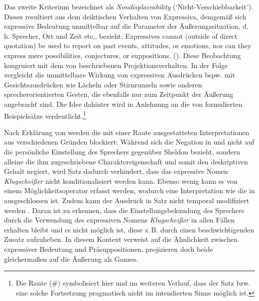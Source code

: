 Das zweite Kriterium bezeichnet \citet[169ff.]{Potts.2007a} als \textit{Nondisplaceability} (`Nicht-Verschiebbarkeit'). Dieses resultiert aus dem deiktischen Verhalten von Expressiva, demgemäß sich expressive Bedeutung unmittelbar auf die Parameter der Äußerungssituation, d.\,h. Sprecher, Ort und Zeit etc., bezieht: \glqq{}Expressives cannot (outside of direct quotation) be used to report on past events, attitudes, or emotions, nor can they express mere possibilities, conjectures, or suppositions.\grqq{} ({\citealt[169]{Potts.2007a}}). Diese Beobachtung kongruiert mit dem von {\citet[8]{Kaplan.1997}} beschriebenen Projektionsverhalten. In der Folge vergleicht {\citet[272]{Cruse.1986}} die unmittelbare Wirkung von expressiven Ausdrücken bspw. mit Gesichtsausdrücken wie Lächeln oder Stirnrunzeln sowie anderen sprecherorientierten Gesten, die ebenfalls nur zum Zeitpunkt der Äußerung angebracht sind. Die Idee dahinter wird in Anlehnung an die von {\citet[10]{dAvis.2019b}} formulierten Beispielsätze verdeutlicht.\footnote{Die Raute (\#) symbolisiert hier und im weiteren Verlauf, dass der Satz bzw. eine solche Fortsetzung pragmatisch nicht im intendierten Sinne möglich ist.}

\ea   \label{sheldon2}
 \z
 \z

Nach Erklärung von {\citet[10]{dAvis.2019b}} werden die mit einer Raute ausgestatteten Interpretationen aus verschiedenen Gründen blockiert: Während sich die Negation in  und  nicht auf die persönliche Einstellung des Sprechers gegenüber Sheldon bezieht, sondern alleine die ihm zugeschriebene Charaktereigenschaft und somit den deskriptiven Gehalt negiert, wird {Satz } dadurch verhindert, dass das expressive Nomen \textit{Klugscheißer} nicht konditionalisiert werden kann. Ebenso wenig kann es von einem Möglichkeitsoperator erfasst werden, wodurch eine Interpretation wie die in  ausgeschlossen ist. Zudem kann der Ausdruck in {Satz } nicht temporal modifiziert werden \citep[vgl.][10]{dAvis.2019b}. Daran ist zu erkennen, dass die Einstellungsbekundung des Sprechers durch die Verwendung des expressiven Nomens \textit{Klugscheißer} in allen Fällen erhalten bleibt und es nicht möglich ist, diese z.\,B. durch einen beschwichtigenden Zusatz aufzuheben. In diesem Kontext verweist \citet[15]{Gutzmann.2019a} auf die Ähnlichkeit zwischen expressiver Bedeutung und Präsuppositionen, projizieren doch beide gleichermaßen auf die Äußerung als Ganzes.

